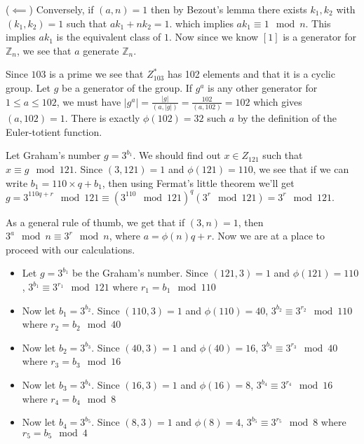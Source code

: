 \documentclass[12pt]{exam}
\theoremstyle{plain} %
\theoremstyle{definition} %
\theoremstyle{remark} %
\begin{document}
\begin{questions}
\begin{solution}
    ($\impliedby$) Conversely, if $(a, n) = 1$ then by Bezout's lemma there exists $k_1, k_2$ with $(k_1, k_2) = 1$ such that $ak_1 + nk_2 = 1$. which implies $ak_1 \equiv 1 \mod n$. This implies $ak_1$ is the equivalent class of $1$. Now since we know $[1]$ is a generator for $\mathbb{Z}_n$, we see that $a$ generate $ \mathbb{Z}_n$.
  \end{solution}

  \question
  \begin{solution}
    Since $103$ is a prime we see that $Z_{103}^{*}$ has 102 elements and that it is a cyclic group. Let $g$ be a generator of the group. If $g^{a}$ is any other generator for $1 \le a \le 102$, we must have $|g^a| = \frac{|g|}{(a, |g|)} = \frac{102}{(a, 102)} = 102 $ which gives $(a, 102) = 1$. There is exactly $\phi(102) = 32$ such $a$ by the definition of the Euler-totient function.
  \end{solution}

\question
\begin{solution}
  Let Graham's number $g = 3^{b_1}$. We should find out $x \in Z_{121}$ such that $x \equiv g \mod 121$. Since $(3, 121) = 1$ and $\phi(121) = 110$, we see that if we can write $b_1 = 110\times q + b_1$, then using Fermat's little theorem we'll get $g = 3^{110q + r} \mod 121 \equiv (3^{110} \mod 121)^q(3^r \mod 121) = 3^r \mod 121$.

  As a general rule of thumb, we get that if $(3, n) = 1$, then $3^a \mod n \equiv 3^{r} \mod n$, where $a = \phi(n) q + r$. Now we are at a place to proceed with our calculations.
  \begin{itemize}[]
    \item Let $g = 3^{b_1}$ be the Graham's number. Since $(121, 3) = 1$ and $\phi(121) = 110$, $3^{b_1} \equiv 3^{r_1} \mod 121$ where $r_1 = b_1 \mod 110$
    \item Now let $b_1 = 3^{b_2}$. Since $(110, 3) = 1$ and $\phi(110) = 40$, $3^{b_2} \equiv 3^{r_2} \mod 110$ where $r_2 = b_2 \mod 40$
    \item Now let $b_2 = 3^{b_3}$. Since $(40, 3) = 1$ and $\phi(40) = 16$, $3^{b_3} \equiv 3^{r_3}\mod 40$ where $r_3 = b_3 \mod 16$
    \item Now let $b_3 = 3^{b_4}$. Since $(16, 3) = 1$ and $\phi(16) = 8$, $3^{b_4} \equiv 3^{r_4}\mod 16$ where $r_4 = b_4 \mod 8$
    \item Now let $b_4 = 3^{b_5}$. Since $(8, 3) = 1$ and $\phi(8) = 4$, $3^{b_5} \equiv 3^{r_5}\mod 8$ where $r_5 = b_5 \mod 4$
  \end{itemize}


\end{solution}
\end{questions}
\end{document}
